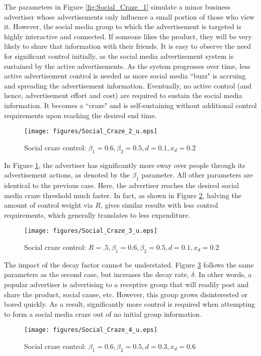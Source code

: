 The parameters in Figure \ref{fig:Social_Craze_1} simulate a minor business advertiser whose advertisements only influence a small portion of those who view it. However, the social media group to which the advertisement is targeted is highly interactive and connected. If someone likes the product, they will be very likely to share that information with their friends. It is easy to observe the need for significant control initially, as the social media advertisement system is sustained by the active advertisements. As the system progresses over time, less active advertisement control is needed as more social media ``buzz" is accruing and spreading the advertisement information. Eventually, no active control (and hence, advertisement effort and cost) are required to sustain the social media information. It becomes a ``craze" and is self-sustaining without additional control requirements upon reaching the desired end time. 
\begin{figure}[!htbp] \centering
  \texttt{[image: figures/Social\_Craze\_2\_u.eps]}
  \caption{Social craze control: $\beta_1=0.6,\beta_2=0.5,d=0.1,x_d=0.2$}
  \label{fig:Social_Craze_2}
\end{figure}

In Figure \ref{fig:Social_Craze_2}, the advertiser has significantly more sway over people through its advertisement actions, as denoted by the $\beta_1$ parameter. All other parameters are identical to the previous case. Here, the advertiser reaches the desired social media craze threshold much faster. In fact, as shown in Figure \ref{fig:Social_Craze_3}, halving the amount of control weight via $R$, gives similar results with less control requirements, which generally translates to less expenditure. 
\begin{figure}[!htbp] \centering
  \texttt{[image: figures/Social\_Craze\_3\_u.eps]}
  \caption{Social craze control: $R=.5,\beta_1=0.6,\beta_2=0.5,d=0.1,x_d=0.2$}
  \label{fig:Social_Craze_3}
\end{figure}

The impact of the decay factor cannot be understated. Figure \ref{fig:Social_Craze_4} follows the same parameters as the second case, but increases the decay rate, $\delta$. In other words, a popular advertiser is advertising to a receptive group that will readily post and share the product, social cause, etc. However, this group grows disinterested or bored quickly. As a result, significantly more control is required when attempting to form a social media craze out of no initial group information.
\begin{figure}[!htbp] \centering
  \texttt{[image: figures/Social\_Craze\_4\_u.eps]}
  \caption{Social craze control: $\beta_1=0.6,\beta_2=0.5,d=0.3,x_d=0.6$}
  \label{fig:Social_Craze_4}
\end{figure}

